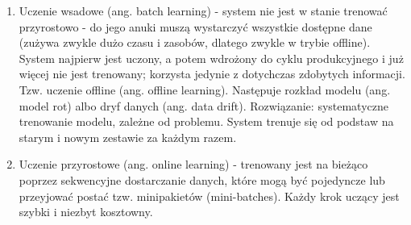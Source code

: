 \documentclass[polish,12pt,a4paper]{article}
\begin{document}
\begin{enumerate}
\begin{enumerate}
			\item Uczenie wsadowe (ang. batch learning) - system nie jest w stanie trenować przyrostowo - do jego anuki muszą wystarczyć wszystkie dostępne dane (zużywa zwykle dużo czasu i zasobów, dlatego zwykle w trybie offline). System najpierw jest uczony, a potem wdrożony do cyklu produkcyjnego i już więcej nie jest trenowany; korzysta jedynie z dotychczas zdobytych informacji. Tzw. uczenie offline (ang. offline learning).
			Następuje rozkład modelu (ang. model rot) albo dryf danych (ang. data drift). Rozwiązanie: systematyczne trenowanie modelu, zależne od problemu. System trenuje się od podstaw na starym i nowym zestawie za każdym razem.
			\item Uczenie przyrostowe (ang. online learning) - trenowany jest na bieżąco poprzez sekwencyjne dostarczanie danych, które mogą być pojedyncze lub przeyjować postać tzw. minipakietów (mini-batches). Każdy krok uczący jest szybki i niezbyt kosztowny.
		\end{enumerate}
	\end{enumerate}
\end{document}
